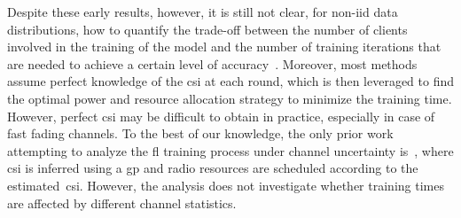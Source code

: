 \documentclass[10pt, conference, letterpaper]{IEEEtran}
\begin{document}
	Despite these early results, however, it is still not clear, for non-\gls{iid} data distributions, how to quantify the trade-off between the number of clients involved in the training of the model and the number of training iterations that are needed to achieve a certain level of accuracy~\cite{BrendanMcMahan2017}.
	Moreover, most methods assume perfect knowledge of the \gls{csi} at each round, which is then leveraged to find the optimal power and resource allocation strategy to minimize the training time. However, perfect \gls{csi} may be difficult to obtain in practice, especially in case of fast fading channels.
	To the best of our knowledge, the only prior work attempting to analyze the \gls{fl} training process under channel uncertainty is~\cite{wadu2020federated}, where \gls{csi} is inferred using a \gls{gp} and radio resources are scheduled according to the estimated~\gls{csi}. However, the analysis does not investigate whether training times are affected by different channel statistics.
	
\end{document}

